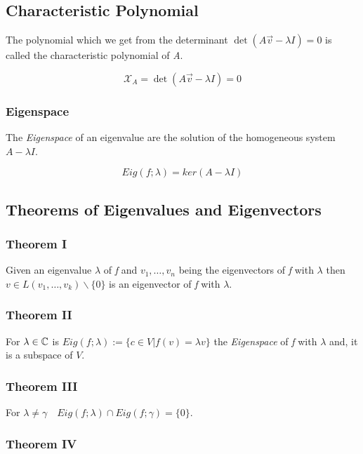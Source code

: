 \subsection{Characteristic Polynomial}

The polynomial which we get from the determinant \(\det (A\vec{v} - \lambda I)  = 0\) is called 
the characteristic polynomial of \emph{A}.

\[
    \mathcal{X}_A = \det (A\vec{v} - \lambda I) = 0
\]

\subsubsection{Eigenspace}

The \emph{Eigenspace} of an eigenvalue are the solution of the homogeneous system \(A - \lambda I\).

\[
    Eig(f;\lambda) = ker(A - \lambda I)
\]


\subsection{Theorems of Eigenvalues and Eigenvectors}

\subsubsection{Theorem I}

Given an eigenvalue \(\lambda\) of \emph{f} and \(v_1, \dots, v_n\) being the eigenvectors of \emph{f} 
with \(\lambda\) then \(v \in L(v_1, \dots, v_k) \backslash \{0\}\) is an eigenvector of 
\emph{f} with \(\lambda\).
\vspace{\baselineskip}

\subsubsection{Theorem II}

For \(\lambda \in \mathbb{C}\) is \(Eig(f;\lambda):= \{c \in V | f(v) = \lambda v\}\) the \emph{Eigenspace} of 
\emph{f} with \(\lambda\) and, it is a subspace of \(V\).

\subsubsection{Theorem III}

For \(\lambda \ne \gamma \quad Eig(f;\lambda) \cap Eig(f;\gamma) = \{0\}\).

\subsubsection{Theorem IV}


